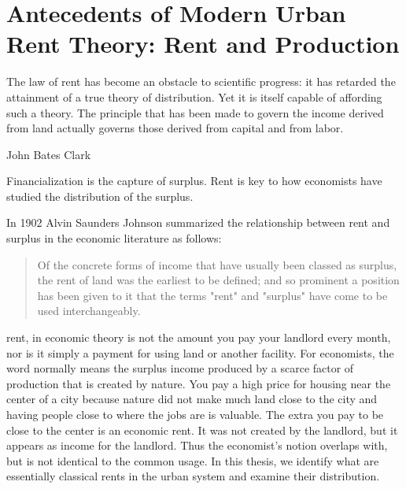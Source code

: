 \chapter{Antecedents of Modern Urban Rent Theory: Rent and Production} \label{chapter-rent}
\epigraph{The law of rent has become an obstacle to scientific progress: it has retarded the attainment of a true theory of distribution. Yet it is itself capable of affording such a theory. The principle that has been made to govern the income derived from land actually governs those derived from capital and from labor. }{John Bates Clark \cite{clarkDistributionDeterminedLaw1891}}

Financialization is the capture of surplus. Rent is key to how economists have studied the distribution of the surplus. %

In 1902 Alvin Saunders Johnson \cite{johnsonRentModernEconomic1902} summarized the relationship between rent and surplus in the economic literature as follows: 

\begin{quotation}Of the concrete forms of income that have usually been classed as surplus, the rent of land was the earliest to be defined; and so prominent a position has been given to it that the terms "rent" and "surplus" have come to be used interchangeably.\end{quotation} 

\Gls{rent}, in economic theory is not the amount you pay your landlord every month, nor is it simply a payment for using land or another facility.  For economists, the word normally means the \gls{surplus} income produced by a scarce factor of production that is created by nature. You pay a high price for housing near the center of a city because nature did not make much land close to the city and having people close to where the jobs are is valuable. The extra you pay to be close to the center is an economic rent. It was not created by the landlord, but it appears as income for the landlord. Thus the economist's notion overlaps with, but is not identical to the common usage. In this thesis, we identify what are essentially classical rents in the urban system and examine their distribution.

